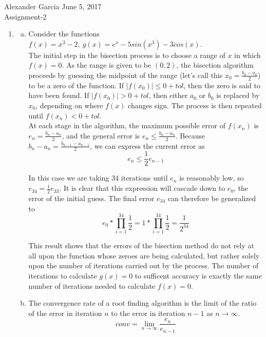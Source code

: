 \documentclass[11pt]{article}
\begin{document}
\begin{center} Alexander Garcia \hfill June 5, 2017 \\ Assignment-2 \end{center}

\medskip

\begin{enumerate}

\item

	\begin{enumerate}[(a)]

		\item Consider the functions $f(x) = x^3 - 2,\ g(x) = e^x - 5sin(x^3) - 3cos(x)$. \\

		The initial step in the bisection process is to choose a range of $x$ in which $f(x) = 0$. As the range is given to be $(0,2)$,
		the bisection algorithm proceeds by guessing the midpoint of the range (let's call this $x_0 = \frac{b_0-a_0}{2}$) to be a zero
		of the function. If $|f(x_0)| \leq 0 + tol$, then the zero is said to have been found. If $|f(x_0)| > 0 + tol$, then either
		$a_0$ or $b_0$ is replaced by $x_0$, depending on where $f(x)$ changes sign. The process is then repeated until
		$f(x_n) < 0 + tol$. \\

		At each stage in the algorithm, the maximum possible error of $f(x_n)$ is $e_n = \frac{b_n-a_n}{2}$, and the general error is
		$e_n \leq \frac{b_n-a_n}{2}$. Because $b_n-a_n = \frac{b_{n-1}-a_{n-1}}{2}$, we can express the current error as
		$$e_n \leq \frac{1}{2} e_{n-1}$$

		In this case we are taking 34 iterations until $e_n$ is reasonably low, so $e_{34} = \frac{1}{2} e_{33}$. It is clear that this
		expression will cascade down to $e_0$, the error of the initial guess. The final error $e_{34}$ can therefore be generalized
		to
		$$e_0*\prod_{i = 1}^{34}\frac{1}{2} = 1*\prod_{i=1}^{34}\frac{1}{2} = \frac{1}{2^{34}} $$

		This result shows that the errors of the bisection method do not rely at all upon the function whose zeroes are being
		calculated, but rather solely upon the number of iterations carried out by the process. The number of iterations to calculate
		$g(x) = 0$ to sufficent accuracy is exactly the same number of iterations needed to calculate $f(x) = 0$. \\

		\item The convergence rate of a root finding algorithm is the limit of the ratio of the error in iteration $n$ to the error in
		iteration $n-1$ as $n \rightarrow \infty$.
		$$conv = \lim_{n\to\infty} \frac{e_n}{e_{n-1}}$$


\end{enumerate}
\end{enumerate}
\end{document}
